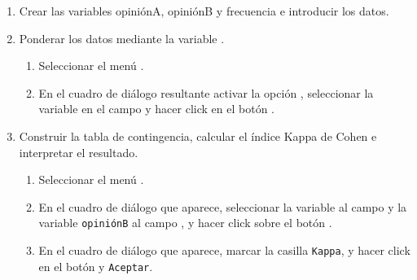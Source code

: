 \begin{enumerate}[leftmargin=*]
\begin{enumerate}
\item Crear las variables \textsf{opiniónA}, \textsf{opiniónB} y \textsf{frecuencia} e introducir los datos.

\item Ponderar los datos mediante la variable .
\begin{indicacion}
\begin{enumerate}
\item Seleccionar el menú .
\item En el cuadro de diálogo resultante activar la opción , seleccionar la variable  en el campo  y hacer click en el botón .
\end{enumerate}
\end{indicacion}

\item Construir la tabla de contingencia, calcular el índice Kappa de Cohen e interpretar el resultado.
\begin{indicacion}
\begin{enumerate}
\item Seleccionar el menú .
\item En el cuadro de diálogo que aparece, seleccionar la variable  al campo  y la variable \texttt{opiniónB} al campo , y hacer click sobre el botón .
\item En el cuadro de diálogo que aparece, marcar la casilla \texttt{Kappa}, y hacer click en el botón  y \texttt{Aceptar}.
\end{enumerate}
\end{indicacion}
\end{enumerate}



\end{enumerate}
